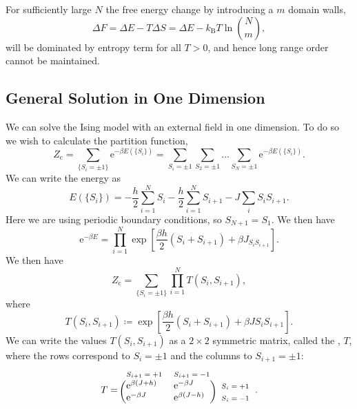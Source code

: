 \documentclass[fleqn]{NotesClass}
\newcommand*{\boltzmann}{k_{\mathrm{B}}}
\newcommand*{\cpartition}{Z_{\mathrm{c}}}
\newcommand*{\e}{\mathrm{e}}
\begin{document}
    For sufficiently large \(N\) the free energy change by introducing a \(m\) domain walls,
    \begin{equation}
        \Delta F = \Delta E - T\Delta S = \Delta E - \boltzmann T\ln \binom{N}{m},
    \end{equation}
    will be dominated by entropy term for all \(T > 0\), and hence long range order cannot be maintained.
    
    \subsection{General Solution in One Dimension}
    We can solve the Ising model with an external field in one dimension.
    To do so we wish to calculate the partition function,
    \begin{equation}
        \cpartition = \sum_{\{S_i = \pm 1\}} \e^{-\beta E(\{S_i\})} = \sum_{S_i = \pm 1} \sum_{S_2 = \pm 1} \dotso \sum_{S_N = \pm 1} \e^{-\beta E(\{S_i\})}.
    \end{equation}
    We can write the energy as
    \begin{equation}
        E(\{S_i\}) = -\frac{h}{2} \sum_{i = 1}^{N}S_i - \frac{h}{2}\sum_{i = 1}^{N}S_{i + 1} - J\sum_{i} S_iS_{i + 1}.
    \end{equation}
    Here we are using periodic boundary conditions, so \(S_{N + 1} = S_1\).
    We then have
    \begin{equation}
        \e^{-\beta E} = \prod_{i = 1}^{N} \exp\left[ \frac{\beta h}{2}(S_i + S_{i + 1}) + \beta J_{S_iS_{i + 1}} \right].
    \end{equation}
    We then have
    \begin{equation}
        \cpartition = \sum_{\{S_i = \pm 1\}} \prod_{i = 1}^{N} T(S_i, S_{i + 1}),
    \end{equation}
    where
    \begin{equation}
        T(S_i, S_{i + 1}) \coloneqq \exp\left[ \frac{\beta h}{2} (S_i + S_{i + 1}) + \beta JS_iS_{i + 1} \right].
    \end{equation}
    We can write the values \(T(S_i, S_{i + 1})\) as a \(2 \times 2\) symmetric matrix, called the , \(T\), where the rows correspond to \(S_i = \pm 1\) and the columns to \(S_{i + 1} = \pm 1\):
    \begin{equation}
        T = 
        \begin{blockarray}{lll}
            \text{\scriptsize\(S_{i+1} = +1\)} & \text{\scriptsize\(S_{i+1} = -1\)} & \\
            \begin{block}{(ll)l}
                \e^{\beta(J + h)} & \e^{-\beta J} & \text{\scriptsize\(S_i = +1\)}\\
                \e^{-\beta J} & \e^{\beta(J - h)} & \text{\scriptsize\(S_i = -1\)}\\
            \end{block}
        \end{blockarray}
        .
    \end{equation}
\end{document}
